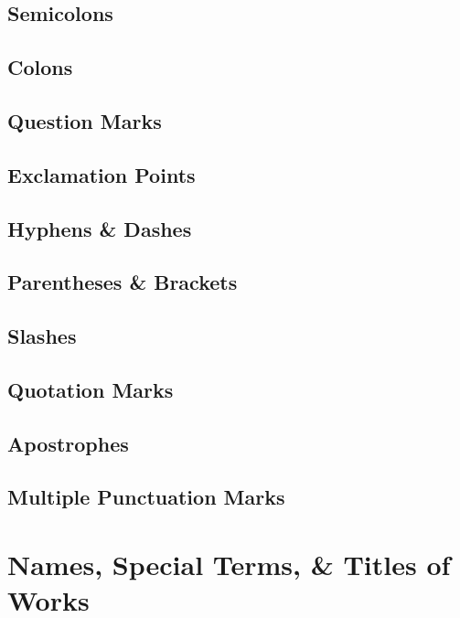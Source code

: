 \documentclass[oneside]{book}
\numberwithin{equation}{section}
\begin{document}
\section{Semicolons}

\section{Colons}

\section{Question Marks}

\section{Exclamation Points}

\section{Hyphens \& Dashes}

\section{Parentheses \& Brackets}

\section{Slashes}

\section{Quotation Marks}

\section{Apostrophes}

\section{Multiple Punctuation Marks}


\chapter{Names, Special Terms, \& Titles of Works}
\end{document}
